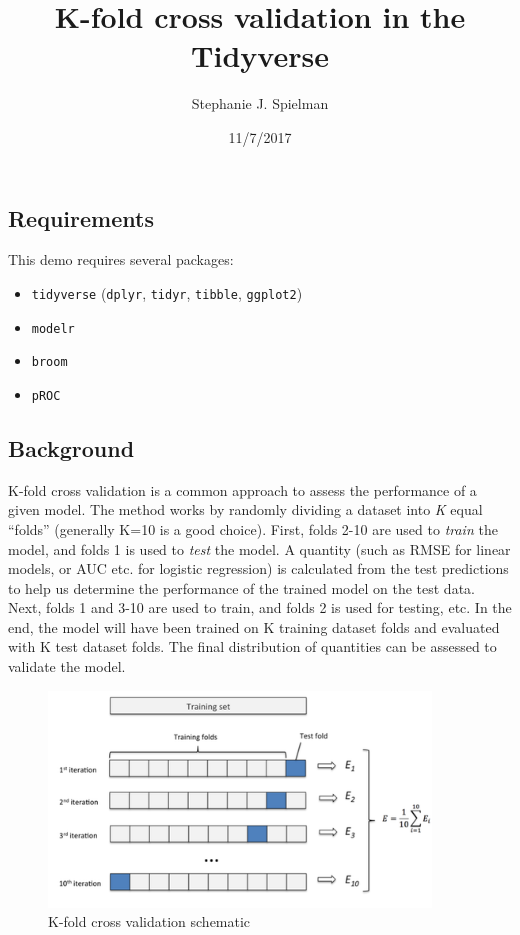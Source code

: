 \documentclass[]{article}
\title{K-fold cross validation in the Tidyverse}
\author{Stephanie J. Spielman}
\date{11/7/2017}
\providecommand{\tightlist}{%
  \setlength{\itemsep}{0pt}\setlength{\parskip}{0pt}}
\begin{document}
\maketitle

\subsection{Requirements}\label{requirements}

This demo requires several packages:

\begin{itemize}
\tightlist
\item
  \texttt{tidyverse} (\texttt{dplyr}, \texttt{tidyr}, \texttt{tibble},
  \texttt{ggplot2})
\item
  \texttt{modelr}
\item
  \texttt{broom}
\item
  \texttt{pROC}
\end{itemize}

\subsection{Background}\label{background}

K-fold cross validation is a common approach to assess the performance
of a given model. The method works by randomly dividing a dataset into
\emph{K} equal ``folds'' (generally K=10 is a good choice). First, folds
2-10 are used to \emph{train} the model, and folds 1 is used to
\emph{test} the model. A quantity (such as RMSE for linear models, or
AUC etc. for logistic regression) is calculated from the test
predictions to help us determine the performance of the trained model on
the test data. Next, folds 1 and 3-10 are used to train, and folds 2 is
used for testing, etc. In the end, the model will have been trained on K
training dataset folds and evaluated with K test dataset folds. The
final distribution of quantities can be assessed to validate the model.

\begin{figure}[h]
\centering
\includegraphics[width=4in]{k-fold.png}
\caption{K-fold cross validation schematic}
\end{figure}
\end{document}
